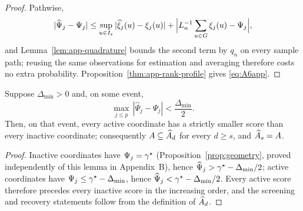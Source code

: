 \begin{proof}
Pathwise,
\[
 |\widehat\Psi_j-\Psi_j|
 \le\sup_{u\in I_\varepsilon}|\widehat\xi_j(u)-\xi_j(u)|
 +\Bigl|L_n^{-1}\sum_{u\in G}\xi_j(u)-\Psi_j\Bigr|,
\]
and Lemma~\ref{lem:app-quadrature} bounds the second term by $q_n$ on
every sample path; reusing the same observations for estimation and
averaging therefore costs no extra probability.
Proposition~\ref{thm:app-rank-profile} gives \eqref{eq:A6app}.
\end{proof}

\begin{lemma}\label{lem:app-separation}
Suppose $\Delta_{\min}>0$ and, on some event,
\[
 \max_{j\le p}\,|\widehat\Psi_j-\Psi_j|<\frac{\Delta_{\min}}{2}.
\]
Then, on that event, every active coordinate has a strictly smaller
score than every inactive coordinate; consequently
$A\subseteq\widehat{A}_d$ for every $d\ge s$, and
$\widehat{A}_s=A$.
\end{lemma}

\begin{proof}
Inactive coordinates have $\Psi_j=\gamma^\star$
(Proposition~\ref{prop:geometry}, proved independently of this lemma
in Appendix~B), hence
$\widehat\Psi_j>\gamma^\star-\Delta_{\min}/2$; active coordinates have
$\Psi_j\le\gamma^\star-\Delta_{\min}$, hence
$\widehat\Psi_j<\gamma^\star-\Delta_{\min}/2$.  Every active score therefore
precedes every inactive score in the increasing order, and the screening
and recovery statements follow from the definition of
$\widehat{A}_d$.
\end{proof}
